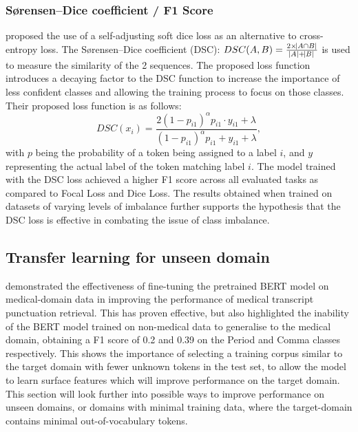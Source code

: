 \documentclass[a4paper]{article}
\begin{document}
\begin{multicols}{2}
\subsubsection{Sørensen–Dice coefficient / F1 Score}




\citet{li2020dice} proposed the use of a self-adjusting soft dice loss as an alternative to cross-entropy loss. The Sørensen–Dice coefficient (DSC): $DSC(A,B)=\frac{2 \times\abs{A \cap B}}{\abs{A} + \abs{B}}$ is used to measure the similarity of the 2 sequences. The proposed loss function introduces a decaying factor to the DSC function to increase the importance of less confident classes and allowing the training process to focus on those classes. Their proposed loss function is as follows: \[
DSC(x_i)=\frac{2{(1-p_{i1})}^{\alpha}p_{i1}\cdot y_{i1}+\lambda}{{(1-p_{i1})}^{\alpha}p_{i1}+ y_{i1}+\lambda} ,\] with $p$ being the probability of a token being assigned to a label $i$, and $y$ representing the actual label of the token matching label $i$.
The model trained with the DSC loss achieved a higher F1 score across all evaluated tasks as compared to Focal Loss and Dice Loss. The results obtained when trained on datasets of varying levels of imbalance further supports the hypothesis that the DSC loss is effective in combating the issue of class imbalance. 


\subsection{Transfer learning for unseen domain}
\citet{medicalasr} demonstrated the effectiveness of fine-tuning the pretrained BERT model on medical-domain data in improving the performance of medical transcript punctuation retrieval. This has proven effective, but also highlighted the inability of the BERT model trained on non-medical data to generalise to the medical domain, obtaining a F1 score of 0.2 and 0.39 on the Period and Comma classes respectively. This shows the importance of selecting a training corpus similar to the target domain with fewer unknown tokens in the test set, to allow the model to learn surface features which will improve performance on the target domain. This section will look further into possible ways to improve performance on unseen domains, or domains with minimal training data, where the target-domain contains minimal out-of-vocabulary tokens.


\end{multicols}
\end{document}
